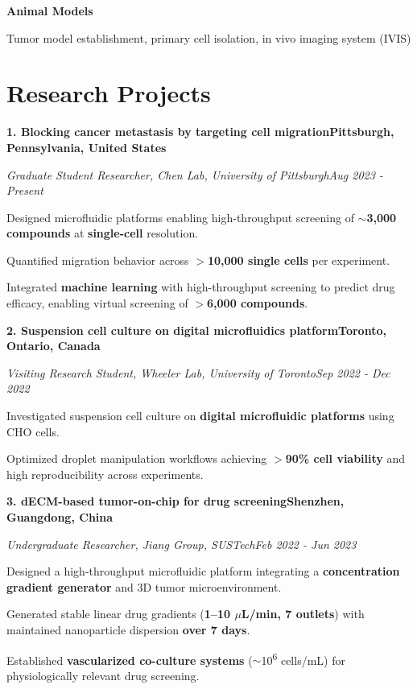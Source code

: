 \documentclass[a4paper,10pt]{article}
\newcommand{\rowbb}[2]{\noindent\textbf{#1}\hfill\textbf{#2}\par}   %
\newcommand{\rowii}[2]{\noindent\textit{#1}\hfill\textit{#2}\par}   %
\begin{document}
\textbf{Animal Models}\par
Tumor model establishment, primary cell isolation, in vivo imaging system (IVIS)\par

\section*{Research Projects}

\rowbb{1. Blocking cancer metastasis by targeting cell migration}{Pittsburgh, Pennsylvania, United States}
\rowii{Graduate Student Researcher, Chen Lab, University of Pittsburgh}{Aug 2023 - Present}
\begin{points}
  \item Designed microfluidic platforms enabling high-throughput screening of
        \textbf{$\sim$3,000 compounds} at \textbf{single-cell} resolution.
  \item Quantified migration behavior across \textbf{$>$10,000 single cells} per experiment.
  \item Integrated \textbf{machine learning} with high-throughput screening to predict
        drug efficacy, enabling virtual screening of \textbf{$>$6,000 compounds}.
\end{points}
\vspace{2.5pt}

\rowbb{2. Suspension cell culture on digital microfluidics platform}{Toronto, Ontario, Canada}
\rowii{Visiting Research Student, Wheeler Lab, University of Toronto}{Sep 2022 - Dec 2022}
\begin{points}
  \item Investigated suspension cell culture on \textbf{digital microfluidic platforms}
        using CHO cells.
  \item Optimized droplet manipulation workflows achieving \textbf{$>$90\% cell viability}
        and high reproducibility across experiments.
\end{points}
\vspace{2.5pt}

\rowbb{3. dECM-based tumor-on-chip for drug screening}{Shenzhen, Guangdong, China}
\rowii{Undergraduate Researcher, Jiang Group, SUSTech}{Feb 2022 - Jun 2023}
\begin{points}
  \item Designed a high-throughput microfluidic platform integrating a
        \textbf{concentration gradient generator} and 3D tumor microenvironment.
  \item Generated stable linear drug gradients (\textbf{1--10 $\mu$L/min, 7 outlets})
        with maintained nanoparticle dispersion \textbf{over 7 days}.
  \item Established \textbf{vascularized co-culture systems}
        ($\sim$10\textsuperscript{6} cells/mL) for physiologically relevant drug screening.
\end{points}
\vspace{2.5pt}
\end{document}
